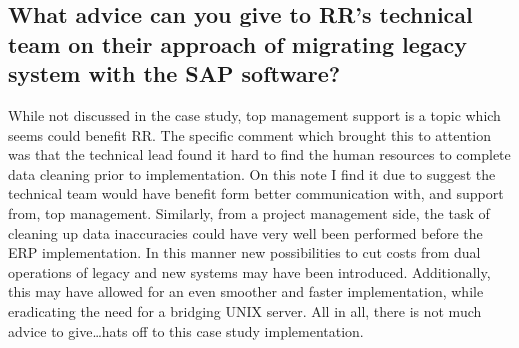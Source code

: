 \documentclass{article}
\begin{document}
\subsection{What advice can you give to RR's technical team on their approach of migrating
legacy system with the SAP software?}
While not discussed in the case study, top management support is a topic which seems could benefit RR.
The specific comment which brought this to attention was that the technical lead found it hard to find the human resources to complete data cleaning prior to implementation.
On this note I find it due to suggest the technical team would have benefit form better communication with, and support from, top management.
Similarly, from a project management side, the task of cleaning up data inaccuracies could have very well been performed before the ERP implementation.
In this manner new possibilities to cut costs from dual operations of legacy and new systems may have been introduced.
Additionally, this may have allowed for an even smoother and faster implementation, while eradicating the need for a bridging UNIX server.
All in all, there is not much advice to give\dots hats off to this case study implementation.
\end{document}
